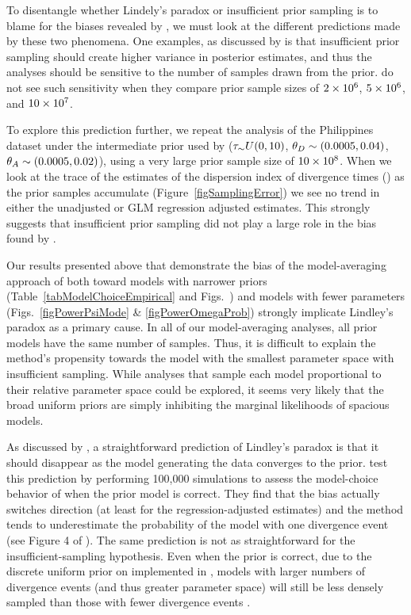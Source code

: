 \documentclass[letterpaper,12pt]{article}
\begin{document}
\begin{linenumbers}
To disentangle whether Lindely's paradox or insufficient prior sampling is
to blame for the biases revealed by \citet{Oaks2012}, we must look at
the different predictions made by these two phenomena.
One examples, as discussed by \citet{Oaks2012} is that insufficient
prior sampling should create higher variance in posterior estimates,
and thus the analyses should be sensitive to the number of samples
drawn from the prior.
\citet{Oaks2012} do not see such sensitivity when they compare prior sample
sizes of $2\times 10^{6}$, $5\times 10^{6}$, and $10\times 10^{7}$.

To explore this prediction further, we repeat the analysis of the Philippines
dataset under the intermediate prior used by \citet{Oaks2012} ($\tau_{\sim} U(0,
10)$, $\meanDescendantTheta{} \sim (0.0005, 0.04)$, $\ancestralTheta{} \sim
(0.0005, 0.02)$), using a very large prior sample size of $10\times 10^{8}$.
When we look at the trace of the estimates of the dispersion index of
divergence times (\vmratio{}) as the prior samples accumulate
(Figure~\ref{figSamplingError}) we see no trend in either the unadjusted or GLM
regression adjusted estimates.
This strongly suggests that insufficient prior sampling did not play a large
role in the bias found by \citet{Oaks2012}.

Our results presented above that demonstrate the bias of the model-averaging
approach of \citet{Hickerson2013} both toward models with narrower \divt{}
priors (Table~\ref{tabModelChoiceEmpirical} and
Figs.~)
and models with fewer \divt{} parameters (Figs.~\ref{figPowerPsiMode} \&
\ref{figPowerOmegaProb}) strongly implicate Lindley's paradox as a primary
cause.
In all of our model-averaging analyses, all prior models have the same number
of samples.
Thus, it is difficult to explain the method's propensity towards the model with
the smallest parameter space with insufficient sampling.
While analyses that sample each model proportional to their relative parameter
space could be explored, it seems very likely that the broad uniform priors
are simply inhibiting the marginal likelihoods of spacious models.

As discussed by \citet{Oaks2012}, a straightforward prediction of Lindley's
paradox is that it should disappear as the model generating the data converges
to the prior.
\citet{Oaks2012} test this prediction by performing 100,000 simulations to
assess the model-choice behavior of \msb when the prior model is correct.
They find that the bias actually switches direction (at least for the
regression-adjusted estimates) and the method tends to underestimate the
probability of the model with one divergence event (see Figure 4 of
\citet{Oaks2012}).
The same prediction is not as straightforward for the insufficient-sampling
hypothesis.
Even when the prior is correct, due to the discrete uniform prior on
\numt{} implemented in \msb, models with larger numbers of divergence
events (and thus greater parameter space) will still be less densely
sampled than those with fewer divergence events \citep{Oaks2012}.






\end{linenumbers}
\end{document}
